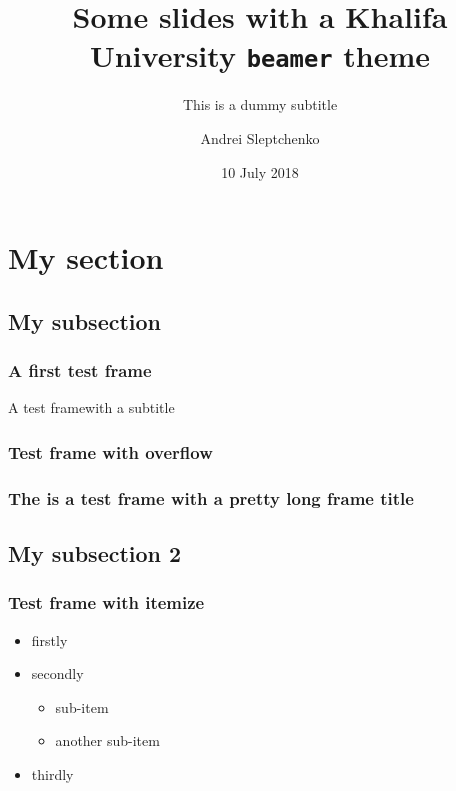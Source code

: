 \documentclass[t, 10pt, handout, aspectratio=169]{beamer}
\title[Khalifa University \texttt{beamer} theme]{Some slides with a Khalifa University \texttt{beamer} theme}
\subtitle{This is a dummy subtitle}
\author[A.Sleptchenko]{Andrei Sleptchenko}
\institute[KU]{Khalifa University}
\date[10/07/2018]{10 July 2018}
\begin{document}
\begin{frame}
  \titlepage
\end{frame}

%
\section{My section}
\subsection{My subsection}

\begin{frame}
  \frametitle{A first test frame}

  \lipsum[2]
\end{frame}

\begin{frame}{A test frame}{with a subtitle}

  \lipsum[2]
\end{frame}


\begin{frame}
  \frametitle{Test frame with overflow}

  \lipsum[2-3]
\end{frame}

\begin{frame}
  \frametitle{The is a test frame with a pretty long frame title}

  \lipsum[2]
\end{frame}


\subsection{My subsection 2}
\begin{frame}
  \frametitle{Test frame with itemize}

  \begin{itemize}
    \item<1-> firstly
    \item<2-> secondly
      \begin{itemize}
        \item sub-item
        \item another sub-item
      \end{itemize}
    \item<3-> thirdly
  \end{itemize}
\end{frame}
\end{document}
